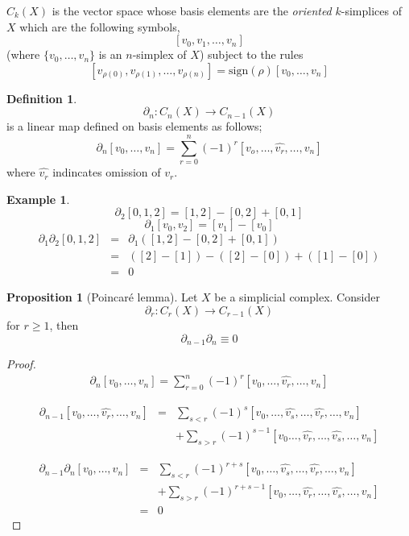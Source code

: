 \documentclass[a4paper,14pt]{extarticle}
\theoremstyle{definition}
\newtheorem*{definition}{Definition}
\newtheorem*{proposition}{Proposition}
\newtheorem*{eg}{Example}
\begin{document}
\noindent $C_k(X)$ is the vector space whose basis elements are the \emph{oriented} $k$-simplices of $X$ which are the following symbols,
\[[v_0,v_1,\ldots,v_n]\] (where  $\{v_0,\ldots,v_n\}$ is an $n$-simplex of $X$) subject to the rules \[[v_{\rho(0)},v_{\rho(1)},\ldots,v_{\rho(n)}]=\text{sign}(\rho)[v_0,\ldots,v_n]\]

\begin{definition}
	\[\partial_n:C_n(X)\rightarrow C_{n-1}(X)\] is a linear map defined on basis elements as follows;
	\[\partial_n[v_0,\ldots,v_n]=\sum_{r=0}^n(-1)^r[v_o,\ldots,\hat{v_r},\ldots,v_n]\] where $\hat{v_r}$ indincates omission of $v_r$.
\end{definition}

\begin{eg}
	\[\partial_2[0,1,2]=[1,2]-[0,2]+[0,1]\]
	\[\partial_1[v_0,v_2]=[v_1]-[v_0]\]
	\begin{eqnarray*}
		\partial_1\partial_2[0,1,2]&=&\partial_1([1,2]-[0,2]+[0,1]) \\
					&=&([2]-[1])-([2]-[0])+([1]-[0]) \\
					&=&0
	\end{eqnarray*}
\end{eg}

\begin{proposition}[Poincaré lemma]
	Let $X$ be a simplicial complex. Consider \[\partial_r:C_r(X)\rightarrow C_{r-1}(X)\] for $r\geq1$, then \[\partial_{n-1}\partial_n\equiv 0\]
\end{proposition}

\begin{proof}
	\begin{eqnarray*}
		\partial_n[v_0,\ldots,v_n]=\sum_{r=0}^n(-1)^r[v_0,\ldots,\hat{v_r},\ldots,v_n]
	\end{eqnarray*}

	\begin{eqnarray*}
		\partial_{n-1}[v_0,\ldots,\hat{v_r},\ldots,v_n]&=&\sum_{s<r}(-1)^s[v_0,\ldots,\hat{v_s},\ldots,\hat{v_r},\ldots,v_n] \\
									&&+\sum_{s>r}(-1)^{s-1}[v_0\ldots,\hat{v_r},\ldots,\hat{v_s},\ldots,v_n]
	\end{eqnarray*}

	\begin{eqnarray*}
		\partial_{n-1}\partial_n[v_0,\ldots,v_n]&=&\sum_{s<r}(-1)^{r+s}[v_0,\ldots,\hat{v_s},\ldots,\hat{v_r},\ldots,v_n] \\
								&&+\sum_{s>r}(-1)^{r+s-1}[v_0,\ldots,\hat{v_r},\ldots,\hat{v_s},\ldots,v_n] \\
								&=&0
	\end{eqnarray*}
\end{proof}
\end{document}
